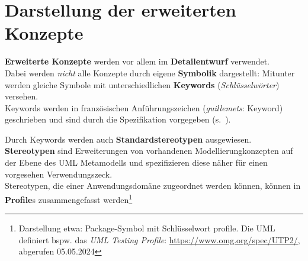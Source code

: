 \section{Darstellung der erweiterten Konzepte}\label{sec:darstellung-der-erweiterten-konzepte}

\textbf{Erweiterte Konzepte} werden vor allem im \textbf{Detailentwurf} verwendet.\\

\noindent
Dabei werden \textit{nicht} alle Konzepte durch eigene \textbf{Symbolik} dargestellt: Mitunter werden gleiche Symbole mit unterschiedlichen \textbf{Keywords} (\textit{Schlüsselwörter}) versehen.\\

\noindent
Keywords werden in französischen Anführungszeichen (\textit{guillemets}: \guillemotleft Keyword\guillemotright) geschrieben und sind durch die Spezifikation vorgegeben (s.~\cite[746 ff.]{OMG17}).

\noindent
Durch Keywords werden auch \textbf{Standardstereotypen} ausgewiesen.\\
\textbf{Stereotypen} sind Erweiterungen von vorhandenen Modellierungkonzepten auf der Ebene des UML Metamodells und spezifizieren diese näher für einen vorgesehen Verwendungszeck.\\

\noindent
Stereotypen, die einer Anwendungsdomäne zugeordnet werden können, können in \textbf{Profile}s zusammengefasst werden\footnote{
Darstellung etwa: Package-Symbol mit Schlüsselwort \guillemotleft profile\guillemotright. Die UML definiert bspw. das \textit{UML Testing Profile}: \url{https://www.omg.org/spec/UTP2/}, abgerufen 05.05.2024
}

